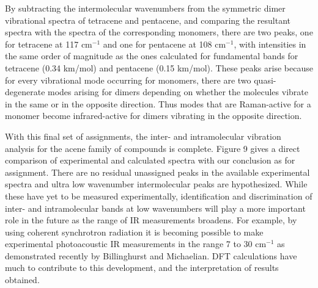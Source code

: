  By subtracting the intermolecular wavenumbers from the symmetric dimer vibrational spectra of tetracene and pentacene, and comparing the resultant spectra with the spectra of the corresponding monomers, there are two peaks, one for tetracene at 117 cm$^{-1}$ and one for pentacene at 108 cm$^{-1}$, with intensities in the same order of magnitude as the ones calculated for fundamental bands for tetracene (0.34 km/mol) and pentacene (0.15 km/mol). These peaks arise because for every vibrational mode occurring for monomers, there are two quasi-degenerate modes arising for dimers depending on whether the molecules vibrate in the same or in the opposite direction. Thus modes that are Raman-active for a monomer become infrared-active for dimers vibrating in the opposite direction. 
 
 With this final set of assignments, the inter- and intramolecular vibration analysis for the acene family of compounds is complete. Figure 9 gives a direct comparison of experimental and calculated spectra with our conclusion as for assignment. There are no residual unassigned peaks in the available experimental spectra and ultra low wavenumber intermolecular peaks are hypothesized.  While these have yet to be measured experimentally, identification and discrimination of inter- and intramolecular bands at low wavenumbers will play a more important role in the future as the range of IR measurements broadens. For example, by using coherent synchrotron radiation it is becoming possible to make experimental photoacoustic IR measurements in the range 7 to 30 cm$^{-1}$ as demonstrated recently by Billinghurst and Michaelian\cite{billinghurst2010photoacoustic}. DFT calculations have much to contribute to this development, and the interpretation of results obtained.
 
